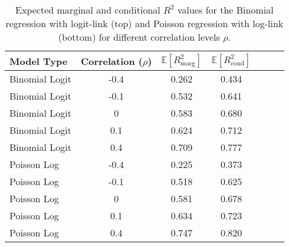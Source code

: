\begin{table}[H]
    \centering
    \begin{tabular}{lcccccc}
    \toprule
    \textbf{Model Type} & \textbf{Correlation (\(\rho\))} & $\mathbb{E}[R^2_{\text{marg}}]$ &  $\mathbb{E}[R^2_{\text{cond}}]$ \\
    \midrule
    Binomial Logit & -0.4 & 0.262 & 0.434 \\
    Binomial Logit & -0.1 & 0.532 & 0.641 \\
    Binomial Logit & 0    & 0.583 & 0.680 \\
    Binomial Logit & 0.1  & 0.624 & 0.712 \\
    Binomial Logit & 0.4  & 0.709 & 0.777 \\
    \midrule
    Poisson Log  & -0.4 & 0.225 & 0.373 \\
    Poisson Log  & -0.1 & 0.518 & 0.625 \\
    Poisson Log  & 0    & 0.581 & 0.678 \\
    Poisson Log  & 0.1  & 0.634 & 0.723 \\
    Poisson Log  & 0.4  & 0.747 & 0.820 \\
    \bottomrule
    \end{tabular}
    \caption[Expected $R^2$ for non-Gaussian GLMMs]{Expected marginal and conditional $R^2$ values for the Binomial regression with logit-link (top) and Poisson regression with log-link (bottom) for different correlation levels $\rho$.}
    \label{table:r2values}
\end{table}

